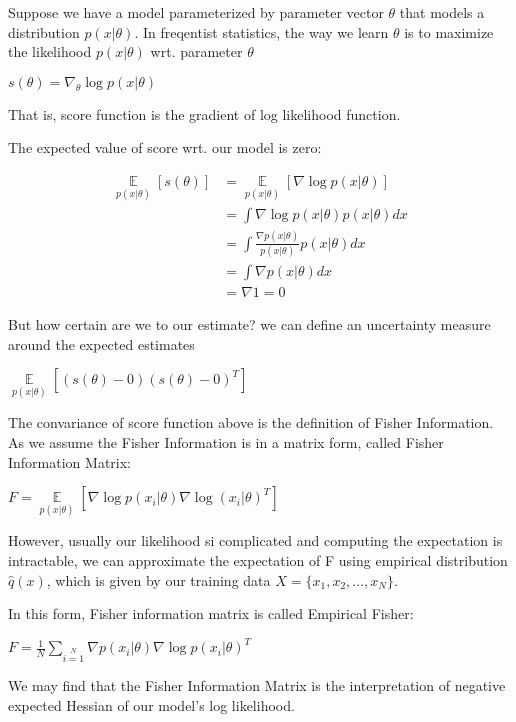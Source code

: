 
Suppose we have a model parameterized by parameter vector $\theta$ that models a distribution $p(x|\theta)$. In freqentist statistics, the way we learn $\theta$ is to maximize the likelihood $p(x|\theta)$ wrt. parameter $\theta$

$s(\theta)=\nabla_{\theta}\log{p(x|\theta)}$

That is, score function is the gradient of log likelihood function.

The expected value of score wrt. our model is zero:

\begin{equation}
    \begin{aligned}
        \mathop{\mathbb{E}}\limits_{p(x|\theta)}[s(\theta)] 
        & = \mathop{\mathbb{E}}\limits_{p(x|\theta)}[\nabla{\log{p(x|\theta)}}] \\
        & = \int{\nabla{\log{p(x|\theta)}p(x|\theta)dx}} \\
        & = \int{\frac{\nabla p(x|\theta)}{p(x|\theta)}p(x|\theta)dx} \\ 
        & = \int{\nabla p(x|\theta) dx} \\ 
        & = \nabla 1 = 0
    \end{aligned}
\end{equation}

But how certain are we to our estimate? we can define an uncertainty measure around the expected estimates

$\mathop{\mathbb{E}}\limits_{p(x|\theta)}[ (s(\theta) - 0)(s(\theta) - 0)^T ]$

The convariance of score function above is the definition of Fisher Information. As we assume the Fisher Information is in a matrix form, called Fisher Information Matrix:

$F = \mathop{\mathbb{E}}\limits_{p(x|\theta)}[ \nabla\log p(x_i|\theta) \nabla\log (x_i|\theta)^T ]$

However, usually our likelihood si complicated and computing the expectation is intractable, we can approximate the expectation of F using empirical distribution $\hat{q}(x)$, which is given by our training data $X=\{x_1, x_2, \dots, x_N\}$.

In this form, Fisher information matrix is called Empirical Fisher:

$F=\frac{1}{N}\sum\limits_{i=1}\limits^{N}\nabla p(x_i|\theta)\nabla \log{p(x_i|\theta)^T}$

We may find that the Fisher Information Matrix is the interpretation of negative expected Hessian of our model's log likelihood.

